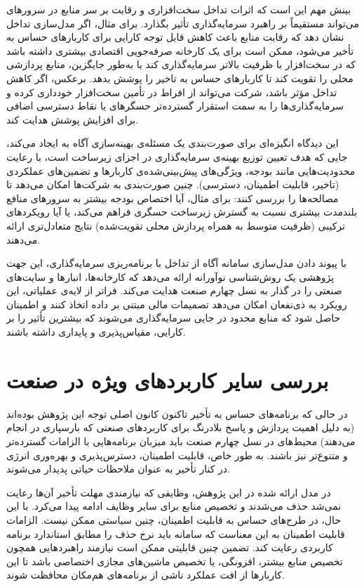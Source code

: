 بینش مهم این است که اثرات تداخل سخت‌افزاری و رقابت بر سر منابع در سرورهای  می‌تواند مستقیماً بر راهبرد سرمایه‌گذاری تأثیر بگذارد. برای مثال، اگر مدل‌سازی تداخل نشان دهد که رقابت منابع باعث کاهش قابل توجه کارایی  برای کاربارهای حساس به تأخیر می‌شود، ممکن است برای یک کارخانه صرفه‌جویی اقتصادی بیشتری داشته باشد که در سخت‌افزار  با ظرفیت بالاتر سرمایه‌گذاری کند یا به‌طور جایگزین، منابع پردازشی محلی را تقویت کند تا کاربارهای حساس به تاخیر را پوشش بدهد. برعکس، اگر کاهش تداخل مؤثر باشد، شرکت می‌تواند از افراط در تأمین سخت‌افزار  خودداری کرده و سرمایه‌گذاری‌ها را به سمت استقرار گسترده‌تر حسگرهای  یا نقاط دسترسی اضافی برای افزایش پوشش هدایت کند.

این دیدگاه انگیزه‌ای برای صورت‌بندی یک مسئله‌ی بهینه‌سازی آگاه به  ایجاد می‌کند، جایی که هدف تعیین توزیع بهینه‌ی سرمایه‌گذاری در اجزای زیرساخت است، با رعایت محدودیت‌هایی مانند بودجه، ویژگی‌های پیش‌بینی‌شده‌ی کاربارها و تضمین‌های عملکردی (تاخیر، قابلیت اطمینان، دسترسی). چنین صورت‌بندی به شرکت‌ها امکان می‌دهد تا مصالحه‌ها را بررسی کنند: برای مثال، آیا اختصاص بودجه بیشتر به سرورهای  منافع بلندمدت بیشتری نسبت به گسترش زیرساخت حسگری  فراهم می‌کند، یا آیا رویکردهای ترکیبی (ظرفیت متوسط  به همراه پردازش محلی تقویت‌شده) نتایج متعادل‌تری ارائه می‌دهند.

با پیوند دادن مدل‌سازی سامانه آگاه از تداخل با برنامه‌ریزی سرمایه‌گذاری، این جهت پژوهشی یک روش‌شناسی نوآورانه ارائه می‌دهد که کارخانه‌ها، انبارها و سایت‌های صنعتی را در گذار به نسل چهارم صنعت هدایت می‌کند. فراتر از لایه‌ی عملیاتی، این رویکرد به ذی‌نفعان امکان می‌دهد تصمیمات مالی مبتنی بر داده اتخاذ کنند و اطمینان حاصل شود که منابع محدود در جایی سرمایه‌گذاری می‌شوند که بیشترین تأثیر را بر کارایی، مقیاس‌پذیری و پایداری داشته باشند.

\section{بررسی سایر کاربردهای ویژه در صنعت}

در حالی که برنامه‌های حساس به تأخیر تاکنون کانون اصلی توجه این پژوهش بوده‌اند (به دلیل اهمیت پردازش و پاسخ بلادرنگ برای کاربردهای صنعتی که بارسپاری در  انجام می‌دهند) محیط‌های  در نسل چهارم صنعت باید میزبان برنامه‌هایی با الزامات گسترده‌تر و متنوع‌تر نیز باشند. به طور خاص، قابلیت اطمینان، دسترس‌پذیری و بهره‌وری انرژی در کنار تأخیر به عنوان ملاحظات حیاتی پدیدار می‌شوند.

در مدل ارائه شده در این پژوهش، وظایفی که نیازمندی مهلت تأخیر آن‌ها رعایت نمی‌شد حذف می‌شدند و تخصیص منابع برای سایر وظایف ادامه پیدا می‌کرد. با این حال، در طرح‌های حساس به قابلیت اطمینان، چنین سیاستی ممکن نیست. الزامات قابلیت اطمینان به این معناست که سامانه باید نرخ حذف را مطابق استاندارد برنامه کاربردی رعایت کند. تضمین چنین قابلیتی ممکن است نیازمند راهبردهایی همچون تخصیص منابع بیشتر، افزونگی، یا تخصیص ماشین‌های مجازی اختصاصی باشد تا این کاربارها از افت عملکرد ناشی از برنامه‌های هم‌مکان محافظت شوند.

